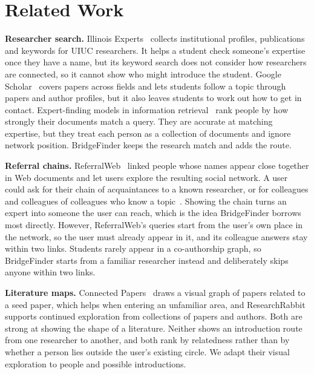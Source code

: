\documentclass[sigconf,nonacm]{acmart}
\begin{document}
\section{Related Work}\label{sec:related}
\textbf{Researcher search.} Illinois Experts~\cite{experts} collects institutional profiles, publications and keywords for UIUC researchers. It helps a student check someone's expertise once they have a name, but its keyword search does not consider how researchers are connected, so it cannot show who might introduce the student. Google Scholar~\cite{scholar} covers papers across fields and lets students follow a topic through papers and author profiles, but it also leaves students to work out how to get in contact. Expert-finding models in information retrieval~\cite{balog2006} rank people by how strongly their documents match a query. They are accurate at matching expertise, but they treat each person as a collection of documents and ignore network position. BridgeFinder keeps the research match and adds the route.

\textbf{Referral chains.} ReferralWeb~\cite{kautz1997} linked people whose names appear close together in Web documents and let users explore the resulting social network. A user could ask for their chain of acquaintances to a known researcher, or for colleagues and colleagues of colleagues who know a topic~\cite{perugini2003}. Showing the chain turns an expert into someone the user can reach, which is the idea BridgeFinder borrows most directly. However, ReferralWeb's queries start from the user's own place in the network, so the user must already appear in it, and its colleague answers stay within two links. Students rarely appear in a co-authorship graph, so BridgeFinder starts from a familiar researcher instead and deliberately skips anyone within two links.

\textbf{Literature maps.} Connected Papers~\cite{connectedpapers} draws a visual graph of papers related to a seed paper, which helps when entering an unfamiliar area, and ResearchRabbit~\cite{researchrabbit} supports continued exploration from collections of papers and authors. Both are strong at showing the shape of a literature. Neither shows an introduction route from one researcher to another, and both rank by relatedness rather than by whether a person lies outside the user's existing circle. We adapt their visual exploration to people and possible introductions.
\end{document}
